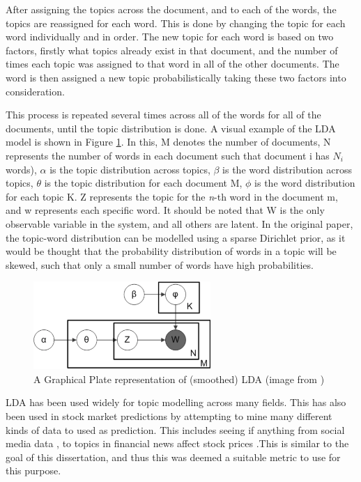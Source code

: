 \noindent After assigning the topics across the document, and to each of the words, the topics are reassigned for each word. This is done by changing the topic for each word individually and in order. The new topic for each word is based on two factors, firstly what topics already exist in that document, and the number of times each topic was assigned to that word in all of the other documents. The word is then assigned a new topic probabilistically taking these two factors into consideration.

\noindent This process is repeated several times across all of the words for all of the documents, until the topic distribution is done. A visual example of the LDA model is shown in Figure \ref{fig:ldafigure}. In this, M denotes the number of documents,
N represents the number of words in each document such that document i has $N_{i}$ words), $\alpha$ is the topic distribution across topics, $\beta$ is the word distribution across topics, $\theta$ is the topic distribution for each document M, $\phi$ is the word distribution for each topic K. Z represents the topic for the \textit{n}-th word in the document m, and w represents each specific word. It should be noted that W is the only observable variable in the system, and all others are latent. In the original paper, the topic-word distribution can be modelled using a sparse Dirichlet prior, as it would be thought that the probability distribution of words in a topic will be skewed, such that only a small number of words have high probabilities. 

\begin{figure}
	\centering
		\includegraphics[width=0.6\textwidth]{images/LDA.png}
	\caption{A Graphical Plate representation of (smoothed) LDA (image from \cite{LDA})}
	\label{fig:ldafigure}
\end{figure}


LDA has been used widely for topic modelling across many fields.  This has also been used in stock market predictions by attempting to mine many different kinds of data to used as prediction. This includes seeing if anything from social media data \cite{nguyen2015sentiment}, to topics in financial news \cite{feuerriegel2016analysis} affect stock prices .This is similar to the goal of this dissertation, and thus this was deemed a suitable metric to use for this purpose. 
 
